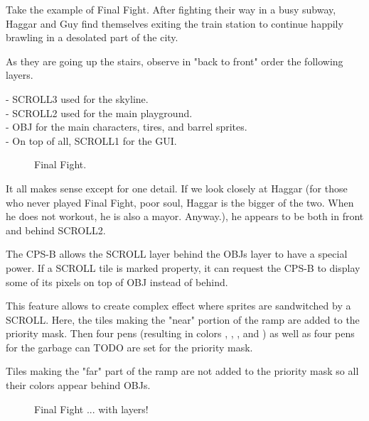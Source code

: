 Take the example of Final Fight. After fighting their way in a busy subway, Haggar and Guy find themselves exiting the train station to continue happily brawling in a desolated part of the city. 

As they are going up the stairs, observe in "back to front" order the following layers.

-  SCROLL3 used for the skyline.\\
-  SCROLL2 used for the main playground.\\
-  OBJ for the main characters, tires, and barrel sprites.\\
-  On top of all, SCROLL1 for the GUI.


\vfill
\begin{figure}[!b]
 \caption*{Final Fight.}%
 \end{figure}%
\pagebreak


It all makes sense except for one detail. If we look closely at Haggar (for those who never played Final Fight, poor soul, Haggar is the bigger of the two. When he does not workout, he is also a mayor. Anyway.), he appears to be both in front and behind SCROLL2.

The CPS-B allows the SCROLL layer behind the OBJs layer to have a special power. If a SCROLL tile is marked property, it can request the CPS-B to display some of its pixels on top of OBJ instead of behind.

This feature allows to create complex effect where sprites are sandwitched by a SCROLL. Here, the tiles making the "near" portion of the ramp are added to the priority mask. Then four pens (resulting in colors  ,  ,  , and ) as well as four pens for the garbage can TODO are set for the priority mask.

Tiles making the "far" part of the ramp are not added to the priority mask so all their colors appear behind OBJs.

\vfill
\begin{figure}[!b]
 \caption*{Final Fight ... with layers!}%
 \end{figure}%
\pagebreak

